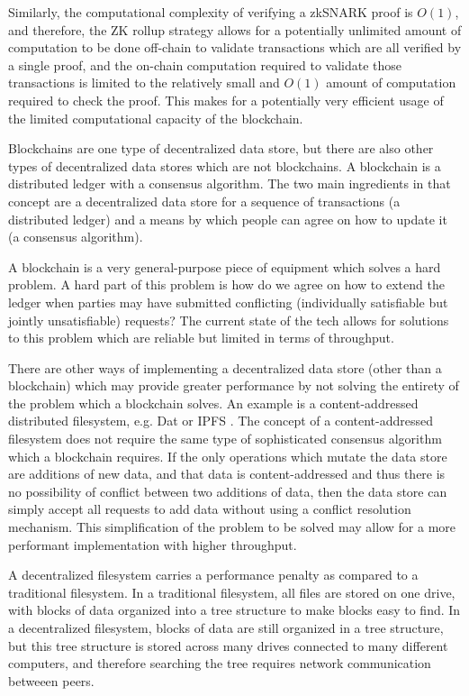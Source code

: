 \documentclass[12pt]{article}
\begin{document}
Similarly, the computational complexity of verifying a zkSNARK proof is $O(1)$, and therefore, the ZK rollup strategy allows for a potentially unlimited amount of computation to be done off-chain to validate transactions which are all verified by a single proof, and the on-chain computation required to validate those transactions is limited to the relatively small and $O(1)$ amount of computation required to check the proof. This makes for a potentially very efficient usage of the limited computational capacity of the blockchain.

Blockchains are one type of decentralized data store, but there are also other types of decentralized data stores which are not blockchains. A blockchain is a distributed ledger with a consensus algorithm. The two main ingredients in that concept are a decentralized data store for a sequence of transactions (a distributed ledger) and a means by which people can agree on how to update it (a consensus algorithm).

A blockchain is a very general-purpose piece of equipment which solves a hard problem. A hard part of this problem is how do we agree on how to extend the ledger when parties may have submitted conflicting (individually satisfiable but jointly unsatisfiable) requests? The current state of the tech allows for solutions to this problem which are reliable but limited in terms of throughput.

There are other ways of implementing a decentralized data store (other than a blockchain) which may provide greater performance by not solving the entirety of the problem which a blockchain solves. An example is a content-addressed distributed filesystem, e.g. Dat \cite{dat} or IPFS \cite{ipfs}. The concept of a content-addressed filesystem does not require the same type of sophisticated consensus algorithm which a blockchain requires. If the only operations which mutate the data store are additions of new data, and that data is content-addressed and thus there is no possibility of conflict between two additions of data, then the data store can simply accept all requests to add data without using a conflict resolution mechanism. This simplification of the problem to be solved may allow for a more performant implementation with higher throughput.

A decentralized filesystem carries a performance penalty as compared to a traditional filesystem. In a traditional filesystem, all files are stored on one drive, with blocks of data organized into a tree structure to make blocks easy to find. In a decentralized filesystem, blocks of data are still organized in a tree structure, but this tree structure is stored across many drives connected to many different computers, and therefore searching the tree requires network communication betweeen peers.
\end{document}
